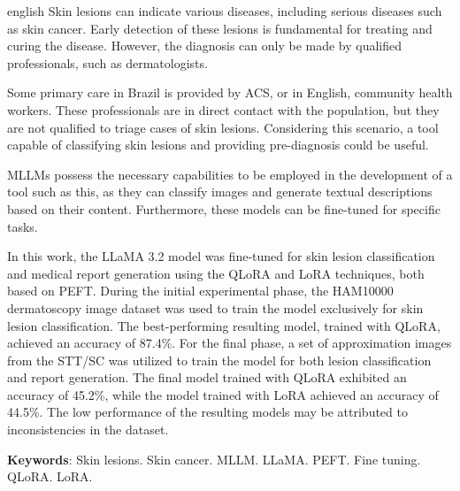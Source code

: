\begin{resumo}[Abstract]
	\SingleSpacing
	\begin{otherlanguage*}{english}
		Skin lesions can indicate various diseases, including serious diseases such as skin cancer. Early detection of these lesions is fundamental for treating and
		curing the disease. However, the diagnosis can only be made by qualified professionals, such as dermatologists.

		Some primary care in Brazil is provided by \acf{ACS}, or in English, community health workers. These professionals are in direct contact with the population, but
		they are not qualified to triage cases of skin lesions. Considering this scenario, a tool capable of classifying skin lesions and providing pre-diagnosis could be
		useful.

		\acfp{MLLM} possess the necessary capabilities to be employed in the development of a tool such as this, as they can classify images and generate textual descriptions
		based on their content. Furthermore, these models can be fine-tuned for specific tasks.

		In this work, the \acf{LLaMA} 3.2 model was fine-tuned for skin lesion classification and medical report generation using the \acf{QLoRA} and \acf{LoRA} techniques,
		both based on \acf{PEFT}. During the initial experimental phase, the \acf{HAM10000} dermatoscopy image dataset was used to train the model exclusively for skin lesion
		classification. The best-performing resulting model, trained with \ac{QLoRA}, achieved an accuracy of 87.4\%. For the final phase, a set of approximation images from
		the \acf{STT/SC} was utilized to train the model for both lesion classification and report generation. The final model trained with \ac{QLoRA} exhibited an accuracy
		of 45.2\%, while the model trained with \ac{LoRA} achieved an accuracy of 44.5\%. The low performance of the resulting models may be attributed to inconsistencies
		in the dataset.

		\textbf{Keywords}: Skin lesions. Skin cancer. MLLM. LLaMA. PEFT. Fine tuning. QLoRA. LoRA.
	\end{otherlanguage*}
\end{resumo}

{
\hypersetup{hidelinks}

\listoffigures

\imprimirlistadesiglas

\tableofcontents*
\cleardoublepage
}
